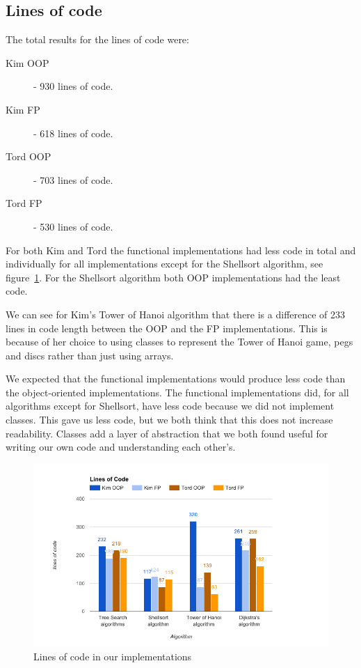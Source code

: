 \documentclass {article}
\begin{document}
\subsection{Lines of code}
The total results for the lines of code were:
\begin{description}
\item[Kim OOP] - 930 lines of code.
\item[Kim FP] - 618 lines of code.
\item[Tord OOP] - 703 lines of code.
\item[Tord FP] - 530 lines of code.
\end{description}
 
For both Kim and Tord the functional implementations had less code in total and individually for all implementations except for the Shellsort algorithm, see figure~\ref{fig:lines-of-code-graph}. For the Shellsort algorithm both OOP implementations had the least code. 
 
We can see for Kim's Tower of Hanoi algorithm that there is a difference of 233 lines in code length between the OOP and the FP implementations. This is because of her choice to using classes to represent the Tower of Hanoi game, pegs and discs rather than just using arrays.
 
We expected that the functional implementations would produce less code than the object-oriented implementations. The functional implementations did, for all algorithms except for Shellsort, have less code because we did not implement classes. This gave us less code, but we both think that this does not increase readability. Classes add a layer of abstraction that we both found useful for writing our own code and understanding each other's.
 
\begin{figure}[H]
\centering
\includegraphics[width=\textwidth]{lines-of-code-graph}

\caption{Lines of code in our implementations}
\label{fig:lines-of-code-graph}
\end{figure}
\end{document}
